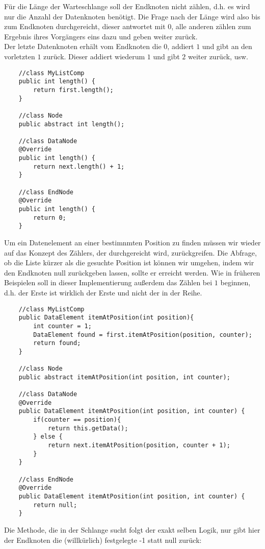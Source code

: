 \documentclass{article}
\begin{document}
Für die Länge der Warteschlange soll der Endknoten nicht zählen, d.h. es wird nur die Anzahl der Datenknoten benötigt. Die Frage nach der Länge wird also bis zum Endknoten durchgereicht, dieser antwortet mit 0, alle anderen zählen zum Ergebnis ihres Vorgängers eins dazu und geben weiter zurück. \\
\bsp Der letzte Datenknoten erhält vom Endknoten die $0$, addiert $1$ und gibt an den vorletzten $1$ zurück. Dieser addiert wiederum $1$ und gibt $2$ weiter zurück, usw.
\begin{verbatim}
    //class MyListComp 
    public int length() {
        return first.length();
    }    

    //class Node 
    public abstract int length();

    //class DataNode 
    @Override
    public int length() {
        return next.length() + 1;
    }

    //class EndNode 
    @Override
    public int length() {
        return 0;
    }
\end{verbatim}
Um ein Datenelement an einer bestimnmten Position zu finden müssen wir wieder auf das Konzept des Zählers, der durchgereicht wird, zurückgreifen. Die Abfrage, ob die Liste kürzer als die gesuchte Position ist können wir umgehen, indem wir den Endknoten null zurückgeben lassen, sollte er erreicht werden. Wie in früheren Beispielen soll in dieser Implementierung außerdem das Zählen bei $1$ beginnen, d.h. der Erste ist wirklich der Erste und nicht der  in der Reihe.
\begin{verbatim}
    //class MyListComp
    public DataElement itemAtPosition(int position){
        int counter = 1;
        DataElement found = first.itemAtPosition(position, counter);
        return found;
    }

    //class Node 
    public abstract itemAtPosition(int position, int counter);

    //class DataNode 
    @Override
    public DataElement itemAtPosition(int position, int counter) {
        if(counter == position){
            return this.getData();
        } else {
            return next.itemAtPosition(position, counter + 1);
        }
    }

    //class EndNode 
    @Override
    public DataElement itemAtPosition(int position, int counter) {
        return null;
    }
\end{verbatim}
Die Methode, die in der Schlange sucht folgt der exakt selben Logik, nur gibt hier der Endknoten die (willkürlich) festgelegte -1 statt null zurück:
\end{document}
